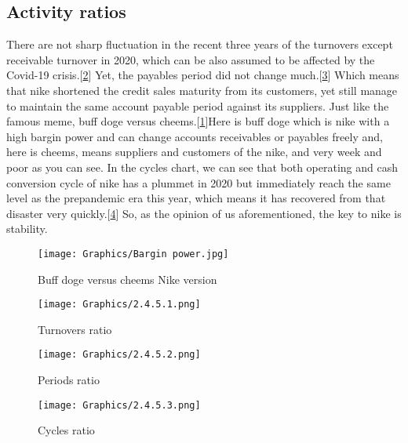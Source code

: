 \documentclass[a4paper, 12pt]{report}
\begin{document}
\subsection{Activity ratios}
There are not sharp fluctuation in the recent three years of the turnovers except receivable turnover in 2020, which can be also assumed to be affected by the Covid-19 crisis.[\ref{2.4.5.1}] Yet, the payables period did not change much.[\ref{2.4.5.2}] Which means that nike shortened the credit sales maturity from its customers, yet still manage to maintain the same account payable period against its suppliers. Just like the famous meme, buff doge versus cheems.[\ref{2.4.5.0}]Here is buff doge which is nike with a high bargin power and can change accounts receivables or payables freely and, here is cheems, means suppliers and customers of the nike, and very week and poor as you can see. In the cycles chart, we can see that both operating and cash conversion cycle of nike has a plummet in 2020 but immediately reach the same level as the prepandemic era this year, which means it has recovered from that disaster very quickly.[\ref{2.4.5.3}] So, as the opinion of us aforementioned, the key to nike is stability.
  \begin{figure}[ht]
 			\begin{center}
				\texttt{[image: Graphics/Bargin power.jpg]}
			\end{center}
       		\caption{\label{2.4.5.0}Buff doge versus cheems Nike version}
 \end{figure}
 \begin{figure}[p]
 			\begin{center}
				\texttt{[image: Graphics/2.4.5.1.png]} 
			\end{center}
       		\caption{\label{2.4.5.1}Turnovers ratio}
 \end{figure}
  \begin{figure}[ht]
 			\begin{center}
				\texttt{[image: Graphics/2.4.5.2.png]} 
			\end{center}
       		\caption{\label{2.4.5.2}Periods ratio}
 \end{figure}
  \begin{figure}[ht]
 			\begin{center}
				\texttt{[image: Graphics/2.4.5.3.png]} 
			\end{center}
       		\caption{\label{2.4.5.3}Cycles ratio}
 \end{figure}
\end{document}

